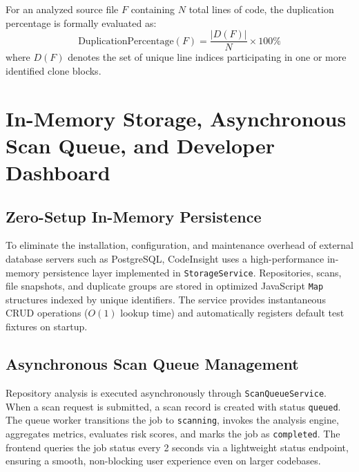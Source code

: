 For an analyzed source file $F$ containing $N$ total lines of code, the duplication percentage is formally evaluated as:
\begin{equation}
\label{eq:duplication_pct}
\boxed{\text{DuplicationPercentage}(F) = \frac{|D(F)|}{N} \times 100\%}
\end{equation}
where $D(F)$ denotes the set of unique line indices participating in one or more identified clone blocks.

\section{In-Memory Storage, Asynchronous Scan Queue, and Developer Dashboard}

\subsection{Zero-Setup In-Memory Persistence}
To eliminate the installation, configuration, and maintenance overhead of external database servers such as PostgreSQL, CodeInsight uses a high-performance in-memory persistence layer implemented in \texttt{StorageService}. Repositories, scans, file snapshots, and duplicate groups are stored in optimized JavaScript \texttt{Map} structures indexed by unique identifiers. The service provides instantaneous CRUD operations ($O(1)$ lookup time) and automatically registers default test fixtures on startup.

\subsection{Asynchronous Scan Queue Management}
Repository analysis is executed asynchronously through \texttt{ScanQueueService}. When a scan request is submitted, a scan record is created with status \texttt{queued}. The queue worker transitions the job to \texttt{scanning}, invokes the analysis engine, aggregates metrics, evaluates risk scores, and marks the job as \texttt{completed}. The frontend queries the job status every 2 seconds via a lightweight status endpoint, ensuring a smooth, non-blocking user experience even on larger codebases.

